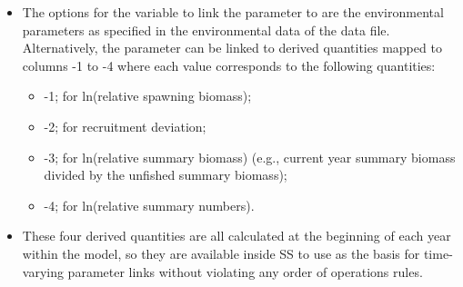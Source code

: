 \begin{itemize}
\begin{itemize}
		\item The options for the variable to link the parameter to are the environmental parameters as specified in the environmental data of the data file. Alternatively, the parameter can be linked to derived quantities mapped to columns -1 to -4 where each value corresponds to the following quantities:
		\begin{itemize}
			\item -1;  for ln(relative spawning biomass);
			\item -2;  for recruitment deviation;
			\item -3;  for ln(relative summary biomass) (e.g., current year summary biomass divided by the unfished summary biomass);
			\item -4;  for ln(relative summary numbers).
		\end{itemize}
		\item These four derived quantities are all calculated at the beginning of each year within the model, so they are available inside SS to use as the basis for time-varying parameter links without violating any order of operations rules.
	\end{itemize}
	

\end{itemize}
